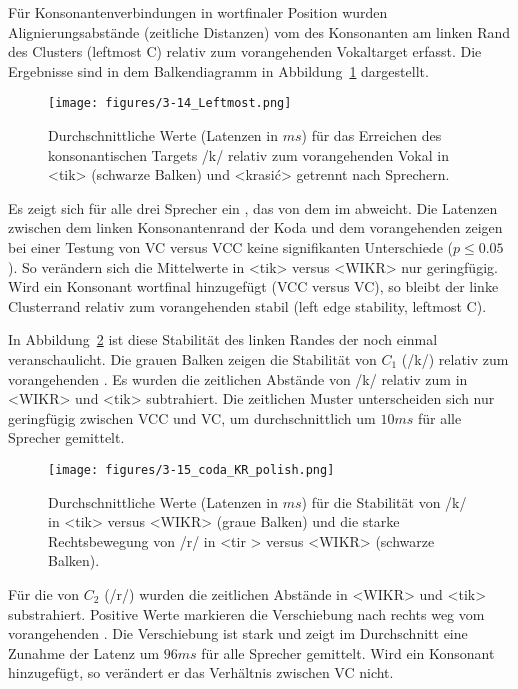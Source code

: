 {Für Konsonantenverbindungen in wortfinaler Position wurden Alignierungsabstände (zeitliche Distanzen) vom  des Konsonanten am linken Rand des Clusters (leftmost C) relativ zum vorangehenden Vokaltarget erfasst. Die Ergebnisse sind in dem Balkendiagramm in Abbildung~\ref{figure:0314} dargestellt.

\begin{figure}
	\texttt{[image: figures/3-14\_Leftmost.png]}
	\caption{Durchschnittliche Werte (Latenzen in $ms$) für das Erreichen des konsonantischen Targets /k/ relativ zum vorangehenden Vokal in <tik> (schwarze Balken) und <krasić> getrennt nach Sprechern.}
	\label{figure:0314}
\end{figure}

Es zeigt sich für alle drei Sprecher ein , das von dem im  abweicht. Die Latenzen zwischen dem linken Konsonantenrand der Koda und dem vorangehenden  zeigen bei einer Testung von VC versus VCC keine signifikanten Unterschiede (${p}\leq0.05$). So verändern sich die Mittelwerte in <tik> versus <WIKR> nur geringfügig. Wird ein Konsonant wortfinal hinzugefügt (VCC versus VC), so bleibt der linke Clusterrand relativ zum vorangehenden  stabil (left edge stability, leftmost C). 

In Abbildung~\ref{figure:0315} ist diese Stabilität des linken Randes der  noch einmal veranschaulicht. Die grauen Balken zeigen die Stabilität von ${C}_{1}$ (/k/) relativ zum vorangehenden . Es wurden die zeitlichen Abstände von /k/ relativ zum  in <WIKR> und <tik> subtrahiert. Die zeitlichen Muster unterscheiden sich nur geringfügig zwischen VCC und VC, um durchschnittlich um $10{ms}$ für alle Sprecher gemittelt. 

\begin{figure}
	\texttt{[image: figures/3-15\_coda\_KR\_polish.png]}
	\caption{Durchschnittliche Werte (Latenzen in $ms$) für die Stabilität von /k/ in <tik> versus <WIKR> (graue Balken) und die starke Rechtsbewegung von /r/ in <tir > versus <WIKR> (schwarze Balken).}
	\label{figure:0315}
\end{figure}

Für die  von ${C}_{2}$ (/r/) wurden die zeitlichen Abstände in <WIKR> und <tik> substrahiert. Positive Werte markieren die Verschiebung nach rechts weg vom vorangehenden . Die Verschiebung ist stark und zeigt im Durchschnitt eine Zunahme der Latenz um $96{ms}$ für alle Sprecher gemittelt. Wird ein Konsonant hinzugefügt, so verändert er das Verhältnis zwischen VC nicht.


}
